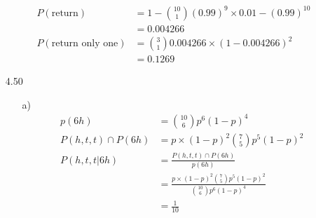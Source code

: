 \documentclass{article}
\begin{document}
\begin{itemize}
\begin{align*}
        P(\text{return})&= 1-\binom{10}{1} \left({0.99}\right)^9\times 0.01-(0.99)^{10}\\
        &=0.004266\\
        P(\text{return only one}) &= \binom{3}{1} 0.004266\times (1-0.004266)^2\\
        &=0.1269
    \end{align*}
    \item [4.50]\begin{itemize}
        \item [a)] 
        \begin{align*}
            p(6h) &= \binom{10}{6} p^6(1-p)^4\\
            P(h,t,t)\cap P(6h)&=p\times (1-p)^2\binom{7}{5} p^5(1-p)^2\\
            P(h,t,t|6h) &= \frac{P(h,t,t)\cap P(6h)}{p(6h)}\\
            &=\frac{p\times (1-p)^2\binom{7}{5} p^5(1-p)^2}{\binom{10}{6} p^6(1-p)^4}\\
            &=\frac{1}{10}
        \end{align*}


\end{itemize}
\end{itemize}
\end{document}
